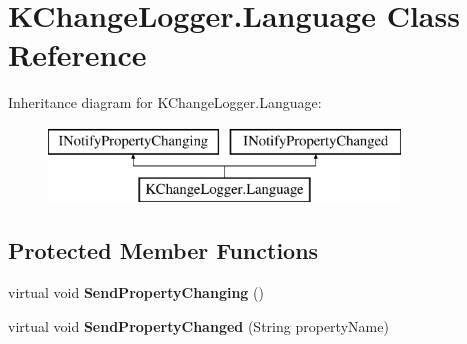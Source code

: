 \hypertarget{class_k_change_logger_1_1_language}{\section{K\-Change\-Logger.\-Language Class Reference}
\label{class_k_change_logger_1_1_language}
}
Inheritance diagram for K\-Change\-Logger.\-Language\-:\begin{figure}[H]
\begin{center}
\leavevmode
\includegraphics[height=2.000000cm]{class_k_change_logger_1_1_language}
\end{center}
\end{figure}
\subsection*{Protected Member Functions}
\begin{DoxyCompactItemize}
\item 
\hypertarget{class_k_change_logger_1_1_language_a9fe005939ffd4d551016c379f034b385}{virtual void {\bfseries Send\-Property\-Changing} ()}\label{class_k_change_logger_1_1_language_a9fe005939ffd4d551016c379f034b385}

\item 
\hypertarget{class_k_change_logger_1_1_language_a0d42f00d44b44f946b17964bc4f1a1ae}{virtual void {\bfseries Send\-Property\-Changed} (String property\-Name)}\label{class_k_change_logger_1_1_language_a0d42f00d44b44f946b17964bc4f1a1ae}

\end{DoxyCompactItemize}
